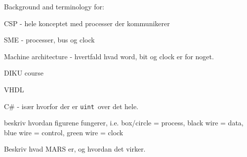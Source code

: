 Background and terminology for:

CSP - hele konceptet med processer der kommunikerer

SME - processer, bus og clock

Machine architecture - hvertfald hvad word, bit og clock er for noget.

DIKU course

VHDL

C\# - især hvorfor der er \texttt{uint} over det hele.

beskriv hvordan figurene fungerer, i.e. box/circle = process, black wire =
data, blue wire = control, green wire = clock

Beskriv hvad MARS er, og hvordan det virker.


